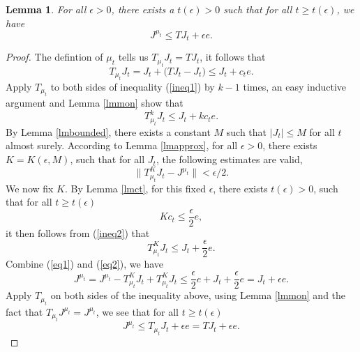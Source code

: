 \documentclass[12pt,a4paper]{amsart}
\numberwithin{equation}{section}
\theoremstyle{plain}
\newtheorem{Lemma}[Th]{Lemma}
\theoremstyle{definition}
\begin{document}
\begin{Lemma} \label{lmjmuest}
	For all $\epsilon > 0$, there exists a $t(\epsilon) > 0$ such that for all $t \geq t(\epsilon)$, we have
	\begin{equation}\label{keyest}
	J^{\mu_t} \leq T J_t + \epsilon e.
	\end{equation}
\end{Lemma}
\begin{proof}
	The defintion of $\mu_t$ tells us $T_{\mu_t} J_t = T J_t$, it follows that 
	\begin{equation}\label{ineq1}
	T_{\mu_t} J_t = J_t + \big(TJ_t - J_t\big) \leq J_t + c_t e.
	\end{equation}
	 Apply $T_{\mu_t}$ to both sides of inequality (\ref{ineq1}) by $k-1$ times, an easy inductive argument and Lemma \ref{lmmon} show that
	\begin{equation}\label{ineq2}
	T_{\mu_t}^{k} J_t \leq J_t + k c_t e. 
	\end{equation}
	By Lemma \ref{lmbounded}, there exists a constant $M$ such that $\big|J_t\big| \leq M$ for all $t$ almost surely.  According to Lemma \ref{lmapprox}, for all $\epsilon > 0$,  there exists $K = K(\epsilon, M)$, such that for all $J_t$, the following estimates are valid,
	\begin{equation}\label{eq1}
	\|T_{\mu_t}^K J_t - J^{\mu_t}\| < \epsilon/2.
	\end{equation}
	We now fix $K$. By Lemma \ref{lmct}, for this fixed $\epsilon$, there exists $t(\epsilon) > 0$, such that for all $t \ge t(\epsilon)$
	$$
	Kc_t \leq \frac{\epsilon}{2} e, 
	$$
	it then follows from (\ref{ineq2}) that
	\begin{equation}\label{eq2}
	T_{\mu_t}^{K} J_t \leq J_t + \frac{\epsilon}{2} e.
	\end{equation}
	Combine (\ref{eq1}) and (\ref{eq2}), we have
	$$
	J^{\mu_t} = J^{\mu_t} - T_{\mu_t}^K J_t + T_{\mu_t}^K J_t \leq \frac{\epsilon}{2} e + J_t + \frac{\epsilon}{2} e = J_t + \epsilon e. 
	$$
	Apply $T_{\mu_t}$ on both sides of the inequality above, using Lemma \ref{lmmon} and the fact that $T_{\mu_t} J^{\mu_t} = J^{\mu_t}$, we see that for all $t \ge t(\epsilon)$
	$$
	J^{\mu_t} \leq T_{\mu_t} J_t + \epsilon e = TJ_t +\epsilon e.
	$$
\end{proof}
\end{document}
